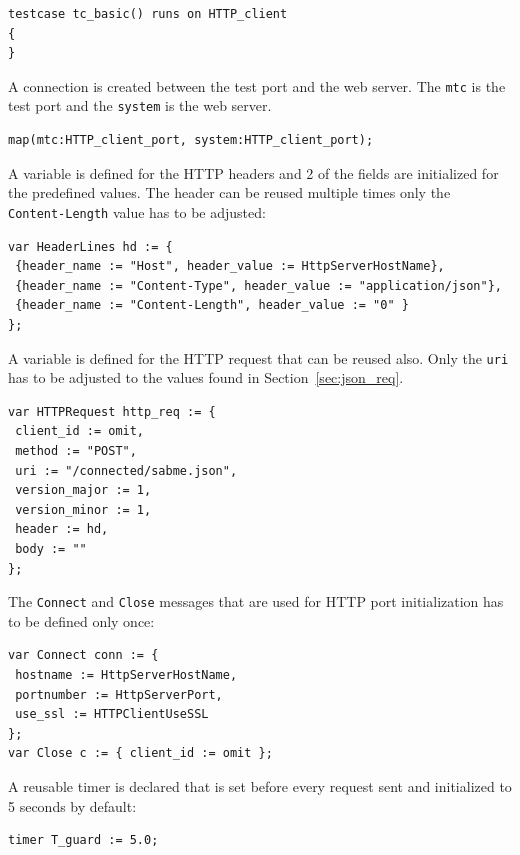 \documentclass[a4paper]{article}
\begin{document}
{\footnotesize
\begin{lstlisting}
testcase tc_basic() runs on HTTP_client
{
}
\end{lstlisting}
}

A connection is created between the test port and the web server. The \verb!mtc! is the test port and
the \verb!system! is the web server.

{\footnotesize
\begin{lstlisting}
map(mtc:HTTP_client_port, system:HTTP_client_port);
\end{lstlisting}
}

A variable is defined for the HTTP headers and 2 of the fields are initialized for the predefined values. The header
can be reused multiple times only the \verb!Content-Length! value has to be adjusted:

{\footnotesize
\begin{lstlisting}
var HeaderLines hd := { 
 {header_name := "Host", header_value := HttpServerHostName},
 {header_name := "Content-Type", header_value := "application/json"},
 {header_name := "Content-Length", header_value := "0" }
};
\end{lstlisting}
}

A variable is defined for the HTTP request that can be reused also. Only the \verb!uri! has to be
adjusted to the values found in Section~\ref{sec:json_req}.

{\footnotesize
\begin{lstlisting}
var HTTPRequest http_req := { 
 client_id := omit, 
 method := "POST", 
 uri := "/connected/sabme.json", 
 version_major := 1, 
 version_minor := 1, 
 header := hd, 
 body := ""
};
\end{lstlisting}
}

The \verb!Connect! and \verb!Close! messages that are used for HTTP port initialization
has to be defined only once:

{\footnotesize
\begin{lstlisting}
var Connect conn := { 
 hostname := HttpServerHostName,
 portnumber := HttpServerPort, 
 use_ssl := HTTPClientUseSSL
};
var Close c := { client_id := omit };
\end{lstlisting}
}

A reusable timer is declared that is set before every request sent and initialized to 5 seconds by default:

{\footnotesize
\begin{lstlisting}
timer T_guard := 5.0;
\end{lstlisting}
}
\end{document}
